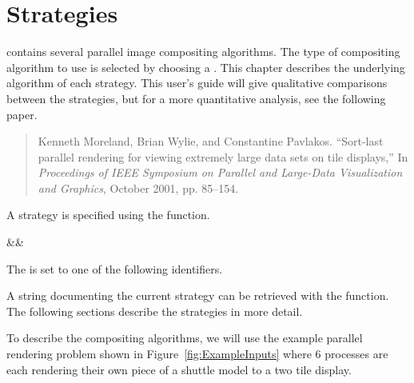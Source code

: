 

\chapter{Strategies}
\label{chap:Strategies}


\IceT contains several parallel image compositing algorithms.  The type of
compositing algorithm to use is selected by choosing a
.  This chapter describes the underlying
algorithm of each strategy.  This user's guide will give qualitative
comparisons between the strategies, but for a more quantitative analysis,
see the following paper.

\begin{quote}
  Kenneth Moreland, Brian Wylie, and Constantine Pavlakos.  ``Sort-last
  parallel rendering for viewing extremely large data sets on tile
  displays,'' In \emph{Proceedings of IEEE Symposium on Parallel and
    Large-Data Visualization and Graphics}, October 2001, pp. 85--154.
\end{quote}

A strategy is specified using the  function.

\begin{Table}{3}
  \textC{(}&&\quad\textC{);}
\end{Table}

The  is set to one of the following identifiers.



A string documenting the current strategy can be retrieved with the
 function.  The following sections describe the
strategies in more detail.

To describe the \IceT compositing algorithms, we will use the example
parallel rendering problem shown in Figure~\ref{fig:ExampleInputs} where 6
processes are each rendering their own piece of a shuttle model to a two
tile display.

